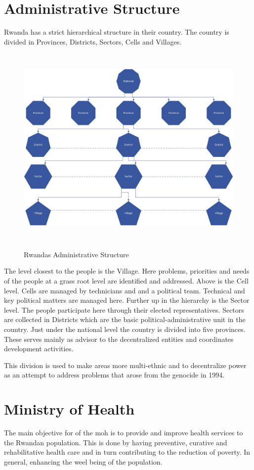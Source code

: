 \section{Administrative Structure}
Rwanda has a strict hierarchical structure in their country. The country is divided in Provinces, Districts, Sectors, Cells and Villages.

\begin{figure}
\centering
\includegraphics[height=10cm]{context/img/rwandaAdminStructure}
\label{rwanda_admin_structure}
\caption{Rwandas Administrative Structure}
\end{figure}

The level closest to the people is the Village. 
Here problems, priorities and needs of the people at a grass root level are identified and addressed. 
Above is the Cell level. 
Cells are managed by technicians and and a political team. 
Technical and key political matters are managed here. 
Further up in the hierarchy is the Sector level. 
The people participate here through their elected representatives. 
Sectors are collected in Districts which are the basic political-administrative unit in the country. 
Just under the national level the country is divided into five provinces. 
These serves mainly as advisor to the decentralized entities and coordinates development activities. \cite{mlg:admin}

This division is used to make areas more multi-ethnic and to decentralize power as an attempt to address problems that arose from the genocide in 1994.

\section{Ministry of Health}
The main objective for of the \gls{moh} is to provide and improve health services to the Rwandan population.
This is done by having preventive, curative and rehabilitative health care and in turn contributing to the reduction of poverty.
In general, enhancing the weel being of the population. 

